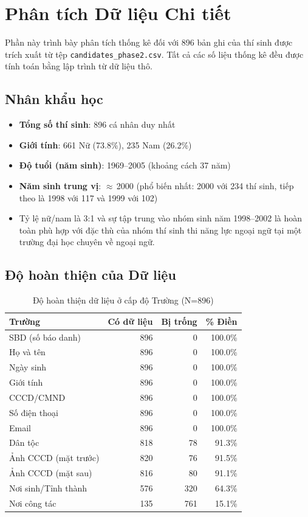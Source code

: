 \documentclass[12pt,a4paper]{article}
\begin{document}
\section{Phân tích Dữ liệu Chi tiết}
\label{sec:analysis}

Phần này trình bày phân tích thống kê đối với 896 bản ghi của thí sinh được trích xuất từ tệp \texttt{candidates\_phase2.csv}. Tất cả các số liệu thống kê đều được tính toán bằng lập trình từ dữ liệu thô.

\subsection{Nhân khẩu học}

\begin{itemize}[noitemsep]
    \item \textbf{Tổng số thí sinh}: 896 cá nhân duy nhất
    \item \textbf{Giới tính}: 661 Nữ (73.8\%), 235 Nam (26.2\%)
    \item \textbf{Độ tuổi (năm sinh)}: 1969--2005 (khoảng cách 37 năm)
    \item \textbf{Năm sinh trung vị}: $\approx$\,2000 (phổ biến nhất: 2000 với 234 thí sinh, tiếp theo là 1998 với 117 và 1999 với 102)
    \item Tỷ lệ nữ/nam là 3:1 và sự tập trung vào nhóm sinh năm 1998--2002 là hoàn toàn phù hợp với đặc thù của nhóm thí sinh thi năng lực ngoại ngữ tại một trường đại học chuyên về ngoại ngữ.
\end{itemize}

\subsection{Độ hoàn thiện của Dữ liệu}

\begin{table}[H]
\centering
\caption{Độ hoàn thiện dữ liệu ở cấp độ Trường (N=896)}
\begin{tabular}{@{}lrrr@{}}
\toprule
\textbf{Trường} & \textbf{Có dữ liệu} & \textbf{Bị trống} & \textbf{\% Điền} \\
\midrule
SBD (số báo danh) & 896 & 0 & 100.0\% \\
Họ và tên & 896 & 0 & 100.0\% \\
Ngày sinh & 896 & 0 & 100.0\% \\
Giới tính & 896 & 0 & 100.0\% \\
CCCD/CMND & 896 & 0 & 100.0\% \\
Số điện thoại & 896 & 0 & 100.0\% \\
Email & 896 & 0 & 100.0\% \\
Dân tộc & 818 & 78 & 91.3\% \\
Ảnh CCCD (mặt trước) & 820 & 76 & 91.5\% \\
Ảnh CCCD (mặt sau) & 816 & 80 & 91.1\% \\
Nơi sinh/Tỉnh thành & 576 & 320 & 64.3\% \\
Nơi công tác & 135 & 761 & 15.1\% \\
\bottomrule
\end{tabular}
\end{table}
\end{document}
